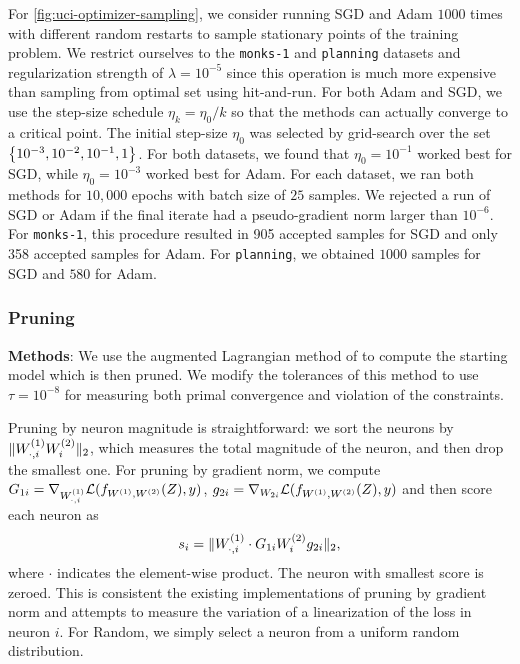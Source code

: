 For \cref{fig:uci-optimizer-sampling}, we consider running SGD and Adam
\( 1000 \) times with different random restarts to sample stationary
points of the training problem.
We restrict ourselves to the \texttt{monks-1} and \texttt{planning} datasets
and regularization strength of \( \lambda = 10^{-5} \)
since this operation is much more expensive than sampling from optimal set
using hit-and-run.
For both Adam and SGD, we use the step-size schedule
\( \eta_k = \eta_0 / k \) so that the methods can actually converge to a critical point.
The initial step-size \( \eta_0 \) was selected by grid-search over the set
\( \left\{10^{-3}, 10^{-2}, 10^{-1}, 1\right\} \).
For both datasets, we found that \( \eta_0 = 10^{-1} \) worked best
for SGD, while \( \eta_0 = 10^{-3} \) worked best for Adam.
For each dataset, we ran both methods for \( 10,000 \) epochs with batch size
of \( 25 \) samples.
We rejected a run of SGD or Adam if the final iterate had a pseudo-gradient
norm larger than \( 10^{-6} \).
For \texttt{monks-1}, this procedure resulted in 905 accepted samples for SGD
and only 358 accepted samples for Adam.
For \texttt{planning}, we obtained \( 1000 \) samples for SGD and \( 580 \)
for Adam.

\subsubsection{Pruning}

\textbf{Methods}:
We use the augmented Lagrangian method of \citet{mishkin2022convex} to compute
the starting model which is then pruned.
We modify the tolerances of this method to use \( \tau = 10^{-8} \) for measuring
both primal convergence and violation of the constraints.

Pruning by neuron magnitude is straightforward: we sort the neurons
by \( \|W^{(1)}_{\cdot, i} W^{(2)}_{i}\|_2 \), which measures the total magnitude of the
neuron, and then drop the smallest one.
For pruning by gradient norm, we compute
\( G_{1i} = \nabla_{W^{(1)}_{\cdot, i}} \mathcal{L}(f_{W^{(1)}, W^{(2)}}(Z), y) \),
\( g_{2i} = \nabla_{W_{2i}} \mathcal{L}(f_{W^{(1)}, W^{(2)}}(Z), y) \) and then score each
neuron as
\[
    s_i = \|W^{(1)}_{\cdot, i} \cdot G_{1i} W^{(2)}_{i} g_{2i}\|_2,
\]
where \( \cdot \) indicates the element-wise product.
The neuron with smallest score is zeroed.
This is consistent the existing implementations of pruning by
gradient norm \citep{bialock2020pruning} and attempts to measure the
variation of a linearization of the loss in neuron \( i \).
For Random, we simply select a neuron from a uniform random distribution.

